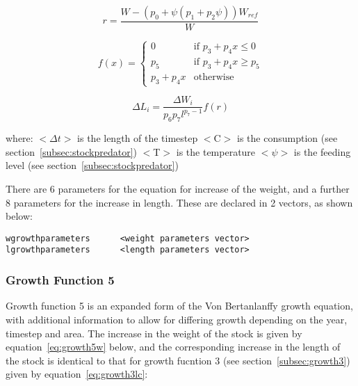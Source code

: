 \documentclass [a4paper, 10pt]{book}
\begin{document}
\begin{equation}\label{eq:growth4la}
 r = \frac{W - \left( p_{0} + \psi \left( p_{1} + p_{2}\psi \right) \right) W_{ref}}{W}
\end{equation}

\begin{equation}\label{eq:growth4lb}
f(x) = 
\begin{cases}
  0
  & \textrm{if $p_{3} + p_{4}x \leq 0$} \\
  p_{5}
  & \textrm{if $p_{3} + p_{4}x \geq p_{5}$} \\ 
  p_{3} + p_{4}x
  & \textrm{otherwise} 
\end{cases}
\end{equation}

\begin{equation}\label{eq:growth4lc}
\Delta L_i = \frac{\Delta W_i} {p_{6} p_{7} l^{p_{7} - 1}} f(r)
\end{equation}

where:\newline
$<$$\Delta t$$>$ is the length of the timestep\newline
$<$C$>$ is the consumption (see section~\ref{subsec:stockpredator})\newline
$<$T$>$ is the temperature\newline
$<$$\psi$$>$ is the feeding level (see section~\ref{subsec:stockpredator})

\bigskip
There are 6 parameters for the equation for increase of the weight, and a further 8 parameters for the increase in length.  These are declared in 2 vectors, as shown below:

\begin{verbatim}
wgrowthparameters      <weight parameters vector>
lgrowthparameters      <length parameters vector>
\end{verbatim}

\subsubsection{Growth Function 5}\label{subsec:growth5}
Growth function 5 is an expanded form of the Von Bertanlanffy growth equation, with additional information to allow for differing growth depending on the year, timestep and area.  The increase in the weight of the stock is given by equation~\ref{eq:growth5w} below, and the corresponding increase in the length of the stock is identical to that for growth fucntion 3 (see section~\ref{subsec:growth3}) given by equation~\ref{eq:growth3lc}:
\end{document}
